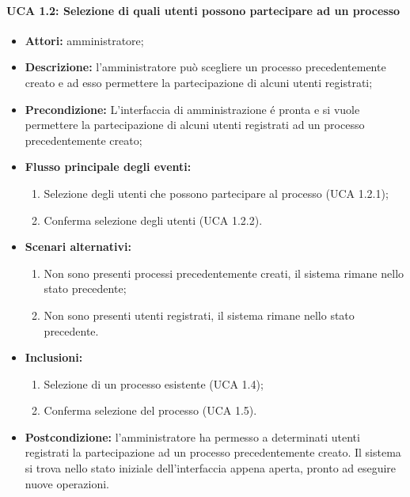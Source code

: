 \paragraph{UCA 1.2: Selezione di quali utenti possono partecipare ad un processo}
\begin{itemize}
\item \textbf{Attori:} 
amministratore;
\item \textbf{Descrizione:} 
l'amministratore può scegliere un processo precedentemente creato e ad esso permettere la partecipazione di alcuni utenti registrati;
\item \textbf{Precondizione:} 
L'interfaccia di amministrazione é pronta e si vuole permettere la partecipazione di alcuni utenti registrati ad un processo precedentemente creato;
\item \textbf{Flusso principale degli eventi:} 
\begin{enumerate}
\item Selezione degli utenti che possono partecipare al processo (UCA 1.2.1);
\item Conferma selezione degli utenti (UCA 1.2.2).
\end{enumerate}
\item \textbf{Scenari alternativi:}
\begin{enumerate}
\item Non sono presenti processi precedentemente creati, il sistema rimane nello stato precedente;
\item Non sono presenti utenti registrati, il sistema rimane nello stato precedente.
\end{enumerate}
\item \textbf{Inclusioni:}
\begin{enumerate}
\item Selezione di un processo esistente (UCA 1.4);
\item Conferma selezione del processo (UCA 1.5).
\end{enumerate}
\item \textbf{Postcondizione:} 
l'amministratore ha permesso a determinati utenti registrati la partecipazione ad un processo precedentemente creato. Il sistema si trova nello stato iniziale dell'interfaccia appena aperta, pronto ad eseguire nuove operazioni.
\end{itemize}

